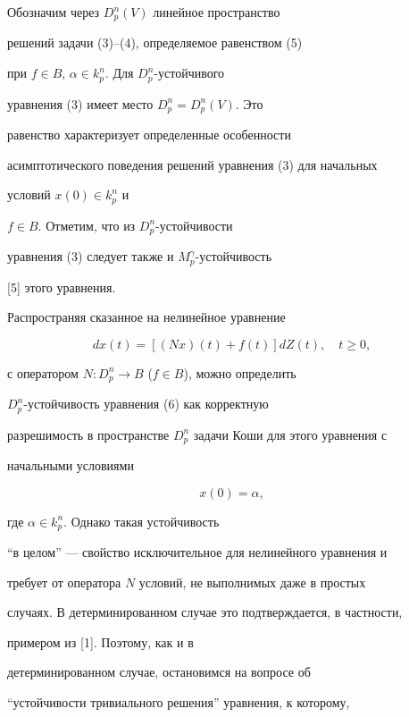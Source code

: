Обозначим через $D_p^n(V)$ линейное пространство


решений задачи (3)--(4), определяемое равенством (5)


при $f \in B$, $\alpha \in k_p^n$. Для $D_p^n$-устойчивого


уравнения (3) имеет место $D_p^n = D_p^n(V)$. Это


равенство характеризует определенные особенности


асимптотического поведения решений уравнения (3) для начальных


условий $x(0) \in k_p^n$ и


$f \in B$. Отметим, что из $D_p^n$-устойчивости


уравнения (3) следует также и $M_p^\gamma $-устойчивость


[5] этого уравнения.





Распространяя сказанное на нелинейное уравнение


\begin{equation}


dx(t) = [(Nx)(t) + f(t)]dZ(t),\quad t \ge 0,


\end{equation}


с оператором $N: D_p^n \to B$ ($f \in B$), можно определить


$D_p^n$-устойчивость уравнения (6) как корректную


разрешимость в пространстве $D_p^n$ задачи Коши для этого уравнения с


начальными условиями


\begin{equation}


x(0) = \alpha,


\end{equation}


где $\alpha \in k_p^n$. Однако такая устойчивость


``в целом'' --- свойство исключительное для нелинейного уравнения и


требует от оператора $N$ условий, не выполнимых даже в простых


случаях. В детерминированном случае это подтверждается, в частности,


примером из [1]. Поэтому, как и в


детерминированном случае, остановимся на вопросе об


``устойчивости тривиального решения'' уравнения, к которому,


